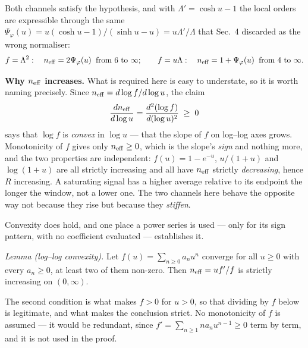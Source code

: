 \documentclass[11pt]{article}
\begin{document}
Both channels satisfy the hypothesis, and with
$\Lambda' = \cosh u - 1$ the local orders are expressible through the
same $\Psi_\varphi(u) = u(\cosh u - 1)/(\sinh u - u) = u\Lambda'/\Lambda$
that Sec.~4 discarded as the wrong normaliser:
\[
  f = \Lambda^2:\quad n_{\rm eff} = 2\Psi_\varphi(u)
  \;\; \text{from } 6 \text{ to } \infty;
  \qquad
  f = u\Lambda:\quad n_{\rm eff} = 1 + \Psi_\varphi(u)
  \;\; \text{from } 4 \text{ to } \infty.
\]

\textbf{Why $n_{\rm eff}$ increases.} What is required here is easy to
understate, so it is worth naming precisely. Since $n_{\rm eff} =
d\log f/d\log u$, the claim
\[
  \frac{dn_{\rm eff}}{d\log u}
  = \frac{d^2(\log f)}{d(\log u)^2} \;\ge\; 0
\]
says that $\log f$ is \emph{convex} in $\log u$ --- that the slope of
$f$ on log--log axes grows. Monotonicity of $f$ gives only
$n_{\rm eff}\ge0$, which is the slope's \emph{sign} and nothing more,
and the two properties are independent: $f(u) = 1-e^{-u}$,
$u/(1{+}u)$ and $\log(1{+}u)$ are all strictly increasing and all have
$n_{\rm eff}$ strictly \emph{decreasing}, hence $R$ increasing. A
saturating signal has a higher average relative to its endpoint the
longer the window, not a lower one. The two channels here behave the
opposite way not because they rise but because they \emph{stiffen}.

Convexity does hold, and one place a power series is used --- only for
its sign pattern, with no coefficient evaluated --- establishes it.

\emph{Lemma (log--log convexity).} Let $f(u) = \sum_{n\ge0}a_nu^n$ converge for all $u\ge0$
with every $a_n\ge0$, at least two of them non-zero. Then
$n_{\rm eff} = uf'/f$ is strictly increasing on $(0,\infty)$.

The second condition is what makes $f>0$ for $u>0$, so that dividing by
$f$ below is legitimate, and what makes the conclusion strict. No
monotonicity of $f$ is assumed --- it would be redundant, since
$f' = \sum_{n\ge1}na_nu^{n-1}\ge0$ term by term, and it is not used in
the proof.
\end{document}
